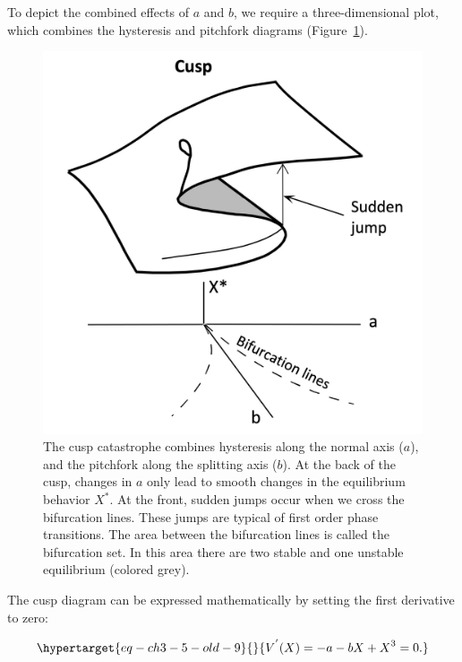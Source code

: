 \documentclass[
  a4paper,
  DIV=11,
  numbers=noendperiod,
  oneside]{scrreprt}
\begin{document}
To depict the combined effects of \(a\) and \(b\), we require a
three-dimensional plot, which combines the hysteresis and pitchfork
diagrams (Figure~\ref{fig-ch3-img10-old-22}).

\begin{figure}

{\centering \includegraphics{media/ch3/image10.jpg}

}

\caption{\label{fig-ch3-img10-old-22}The cusp catastrophe combines
hysteresis along the normal axis (\(a\)), and the pitchfork along the
splitting axis (\(b\)). At the back of the cusp, changes in \(a\) only
lead to smooth changes in the equilibrium behavior \(X^{*}\). At the
front, sudden jumps occur when we cross the bifurcation lines. These
jumps are typical of first order phase transitions. The area between the
bifurcation lines is called the bifurcation set. In this area there are
two stable and one unstable equilibrium (colored grey).}

\end{figure}

The cusp diagram can be expressed mathematically by setting the first
derivative to zero:

\begin{equation}\protect\hypertarget{eq-ch3-5-old-9}{}{
V^{'}(X) = {- a - bX + X}^{3} = 0.
}\label{eq-ch3-5-old-9}\end{equation}
\end{document}
